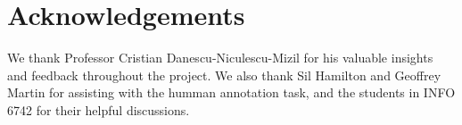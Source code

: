 \section*{Acknowledgements}
We thank Professor Cristian Danescu-Niculescu-Mizil for his valuable insights 
and feedback throughout the project. We also thank Sil Hamilton and 
Geoffrey Martin for assisting with the humman annotation task, and the students 
in INFO 6742 for their helpful discussions.
